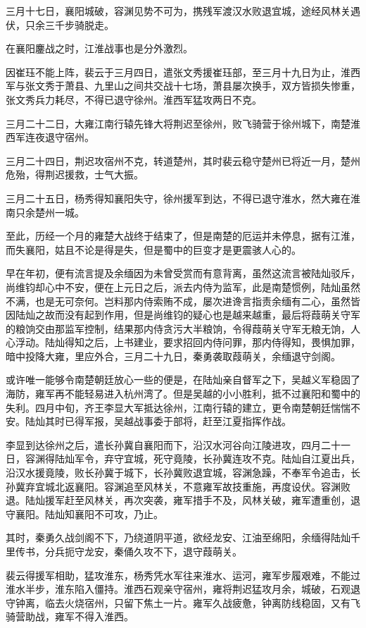 三月十七日，襄阳城破，容渊见势不可为，携残军渡汉水败退宜城，途经风林关遇伏，只余三千步骑脱走。

在襄阳鏖战之时，江淮战事也是分外激烈。

因崔珏不能上阵，裴云于三月四日，遣张文秀援崔珏部，至三月十九日为止，淮西军与张文秀于萧县、九里山之间共交战十七场，萧县屡次换手，双方皆损失惨重，张文秀兵力耗尽，不得已退守徐州。淮西军猛攻两日不克。

三月二十二日，大雍江南行辕先锋大将荆迟至徐州，败飞骑营于徐州城下，南楚淮西军连夜退守宿州。

三月二十四日，荆迟攻宿州不克，转道楚州，其时裴云稳守楚州已将近一月，楚州危殆，得荆迟援救，士气大振。

三月二十五日，杨秀得知襄阳失守，徐州援军到达，不得已退守淮水，然大雍在淮南只余楚州一城。

至此，历经一个月的雍楚大战终于结束了，但是南楚的厄运并未停息，据有江淮，而失襄阳，姑且不论是得是失，但是蜀中的巨变才是更震骇人心的。

早在年初，便有流言提及余缅因为未曾受赏而有意背离，虽然这流言被陆灿驳斥，尚维钧却心中不安，便在上元日之后，派去内侍为监军，此是南楚惯例，陆灿虽然不满，也是无可奈何。岂料那内侍索贿不成，屡次进谗言指责余缅有二心，虽然皆因陆灿之故而没有起到作用，但是尚维钧的疑心也是越来越重，最后将葭萌关守军的粮饷交由那监军控制，结果那内侍贪污大半粮饷，令得葭萌关守军无粮无饷，人心浮动。陆灿得知之后，上书建业，要求招回内侍问罪，那内侍得知，畏惧加罪，暗中投降大雍，里应外合，三月二十九日，秦勇袭取葭萌关，余缅退守剑阁。

或许唯一能够令南楚朝廷放心一些的便是，在陆灿亲自督军之下，吴越义军稳固了海防，雍军再不能轻易进入杭州湾了。但是吴越的小小胜利，抵不过襄阳和蜀中的失利。四月中旬，齐王李显大军抵达徐州，江南行辕的建立，更令南楚朝廷惴惴不安。陆灿其时已得军报，吴越战事委于部将，赶至江夏指挥作战。

李显到达徐州之后，遣长孙冀自襄阳而下，沿汉水河谷向江陵进攻，四月二十一日，容渊得陆灿军令，弃守宜城，死守竟陵，长孙冀连攻不克。陆灿自江夏出兵，沿汉水援竟陵，败长孙冀于城下，长孙冀败退宜城，容渊急躁，不奉军令追击，长孙冀弃宜城北返襄阳。容渊追至风林关，不意雍军故技重施，再度设伏。容渊败退。陆灿援军赶至风林关，再次突袭，雍军措手不及，风林关破，雍军遭重创，退守襄阳。陆灿知襄阳不可攻，乃止。

其时，秦勇久战剑阁不下，乃绕道阴平道，欲经龙安、江油至绵阳，余缅得陆灿千里传书，分兵扼守龙安，秦俑久攻不下，退守葭萌关。

裴云得援军相助，猛攻淮东，杨秀凭水军往来淮水、运河，雍军步履艰难，不能过淮水半步，淮东陷入僵持。淮西石观亲守宿州，雍将荆迟猛攻月余，城破，石观退守钟离，临去火烧宿州，只留下焦土一片。雍军久战疲惫，钟离防线稳固，又有飞骑营助战，雍军不得入淮西。

